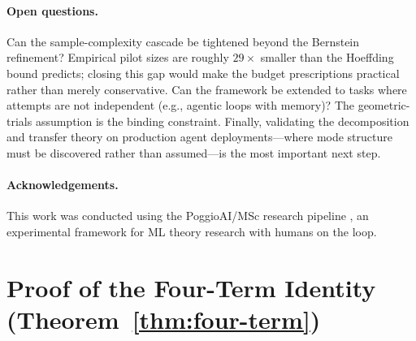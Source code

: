 \documentclass[11pt]{article}
\begin{document}
\paragraph{Open questions.}
Can the sample-complexity cascade be tightened beyond the Bernstein
refinement?  Empirical pilot sizes are roughly $29\times$ smaller than
the Hoeffding bound predicts; closing this gap would make the budget
prescriptions practical rather than merely conservative.
Can the framework be extended to tasks where attempts are not independent
(e.g., agentic loops with memory)?  The geometric-trials assumption is
the binding constraint.
Finally, validating the decomposition and transfer theory on production
agent deployments---where mode structure must be discovered rather than
assumed---is the most important next step.

\paragraph{Acknowledgements.}
This work was conducted using the PoggioAI/MSc research pipeline
\citep{PoggioAIMSc_2026}, an experimental framework for ML theory
research with humans on the loop.





\newpage



\appendix

\section{Proof of the Four-Term Identity (Theorem~\ref{thm:four-term})}
\label{app:four-term}
\end{document}
